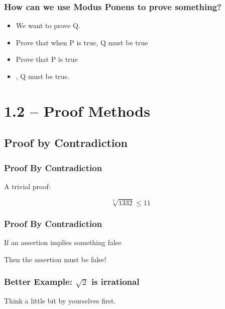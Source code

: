 \documentclass{beamer}
\begin{document}
\begin{frame}
  \frametitle{How can we use Modus Ponens to prove something?}
  \begin{itemize}
  \item We want to prove Q.
  \item Prove that when P is true, Q \alert{must} be true
  \item Prove that P is true
  \item {}, Q must be true.
  \end{itemize}
\end{frame}

\section{1.2 -- Proof Methods}

\subsection{Proof by Contradiction}
\begin{frame}
  \frametitle{Proof By Contradiction}

  A trivial proof:
  
  \begin{equation*}
    \sqrt[3]{1332} \leq 11
  \end{equation*}

\end{frame}

\begin{frame}
  \frametitle{Proof By Contradiction}

  If an assertion \alert{implies something false}

  \bigskip

  Then the \alert{assertion must be false!}
\end{frame}

\begin{frame}
  \frametitle{Better Example: $\sqrt{2}$ is irrational}

  \begin{center}
    Think a little bit by yourselves first.
  \end{center}
\end{frame}
\end{document}
